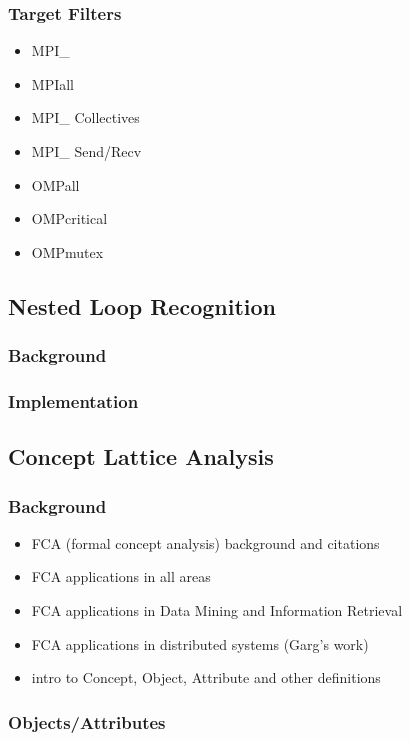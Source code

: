 \subsubsection{Target Filters}
\begin{itemize}
\item MPI\_
\item MPIall
\item MPI\_ Collectives
\item MPI\_ Send/Recv
\item OMPall
\item OMPcritical
\item OMPmutex
\end{itemize}

\subsection{Nested Loop Recognition}
\subsubsection{Background}
\subsubsection{Implementation}


\subsection{Concept Lattice Analysis}
\subsubsection{Background}
\begin{itemize}
\item FCA (formal concept analysis) background and citations
\item FCA applications in all areas
\item FCA applications in Data Mining and Information Retrieval
\item FCA applications in distributed systems (Garg's work)
\item intro to Concept, Object, Attribute and other definitions
\end{itemize}

\subsubsection{Objects/Attributes}


